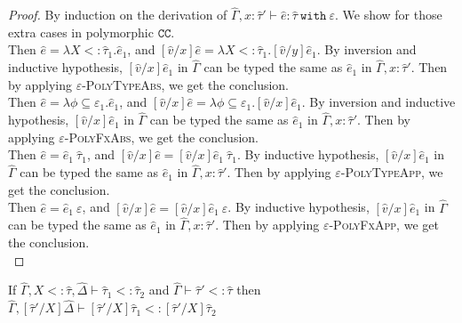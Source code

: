 \documentclass{llncs}
\newcommand{\keywadj}[1]{\mathtt{#1}}
\newcommand{\keyw}[1]{\keywadj{#1}~}
\newcommand{\kw}[1]{\keyw{ #1 }}
\newcommand{\kwa}[1]{\keywadj{ #1 }}
\begin{document}
\begin{proof} By induction on the derivation of $\hat \Gamma, x: \hat \tau' \vdash \hat e: \hat \tau~\kw{with} \varepsilon$. We show for those extra cases in polymorphic $\kwa{CC}$.\\



 Then $\hat e = \lambda X <: \hat \tau_1. \hat e_1$, and $[\hat v/x]\hat e = \lambda X <: \hat \tau_1. [\hat v/y]\hat e_1$. By inversion and inductive hypothesis, $[\hat v/x]\hat e_1$ in $\hat \Gamma$ can be typed the same as $\hat e_1$ in $\hat \Gamma, x: \hat \tau'$. Then by applying \textsc{$\varepsilon$-PolyTypeAbs}, we get the conclusion.\\

 Then $\hat e = \lambda \phi \subseteq \varepsilon_1. \hat e_1$, and $[\hat v/x]\hat e = \lambda \phi \subseteq \varepsilon_1. [\hat v/x]\hat e_1$. By inversion and inductive hypothesis, $[\hat v/x]\hat e_1$ in $\hat \Gamma$ can be typed the same as $\hat e_1$ in $\hat \Gamma, x: \hat \tau'$. Then by applying \textsc{$\varepsilon$-PolyFxAbs}, we get the conclusion. \\


 Then $\hat e = \hat e_1~\hat \tau_1$, and $[\hat v/x]\hat e = [\hat v/x]\hat e_1~\hat \tau_1$. By inductive hypothesis, $[\hat v/x]\hat e_1$ in $\hat \Gamma$ can be typed the same as $\hat e_1$ in $\hat \Gamma, x: \hat \tau'$. Then by applying \textsc{$\varepsilon$-PolyTypeApp}, we get the conclusion.\\

 Then $\hat e = \hat e_1~\varepsilon$, and $[\hat v/x]\hat e = [\hat v/x]\hat e_1~\varepsilon$. By inductive hypothesis, $[\hat v/x]\hat e_1$ in $\hat \Gamma$ can be typed the same as $\hat e_1$ in $\hat \Gamma, x: \hat \tau'$. Then by applying \textsc{$\varepsilon$-PolyFxApp}, we get the conclusion.\\



\end{proof}


\hrulefill

\begin{lemma}
If $\hat \Gamma, X <: \hat \tau, \hat \Delta \vdash \hat \tau_1 <: \hat \tau_2$ and $\hat \Gamma \vdash \hat \tau' <: \hat \tau$ then $\hat \Gamma, [\hat \tau'/X]\hat \Delta \vdash [\hat \tau'/X]\hat \tau_1 <: [\hat \tau'/X]\hat \tau_2$
\end{lemma}
\end{document}
